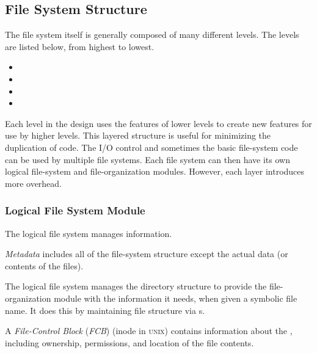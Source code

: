 \subsection{File System Structure}\label{subsec:File_System_Structure}
The file system itself is generally composed of many different levels.
The levels are listed below, from highest to lowest.
\begin{itemize}[noitemsep]
\item {}
\item {}
\item {}
\item {}
\end{itemize}

Each level in the design uses the features of lower levels to create new features for use by higher levels.
This layered structure is useful for minimizing the duplication of code.
The I/O control and sometimes the basic file-system code can be used by multiple file systems.
Each file system can then have its own logical file-system and file-organization modules.
However, each layer introduces more overhead.

\subsubsection{Logical File System Module}\label{subsubsec:Logical_FS_Module}
The logical file system manages  information.

\begin{definition}[Metadata]\label{def:File_Metadata}
  \emph{Metadata} includes all of the file-system structure except the actual data (or contents of the files).
\end{definition}

The logical file system manages the directory structure to provide the file-organization module with the information it needs, when given a symbolic file name.
It does this by maintaining file structure via s.

\begin{definition}\label{def:File_Control_Block}
  A \emph{File-Control Block} (\emph{FCB}) (inode in \textsc{unix}) contains information about the , including ownership, permissions, and location of the file contents.
\end{definition}


